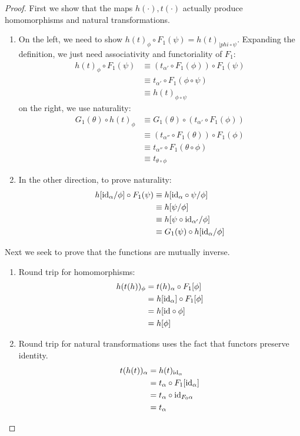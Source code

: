 \documentclass{article}
\begin{document}
\begin{proof}
  First we show that the maps $h(\cdot),t(\cdot)$ actually produce
  homomorphisms and natural transformations.
  \begin{enumerate}
  \item On the left, we need to show $h(t)_{\phi} \circ F_1(\psi) =
    h(t)_{|phi \circ \psi}$. Expanding the definition, we just need
    associativity and functoriality of $F_1$:
    \begin{align*}
      h(t)_{\phi} \circ F_1(\psi) &\equiv (t_{\alpha'} \circ F_1(\phi)) \circ F_1(\psi)\\
      &\equiv t_{\alpha'} \circ F_1(\phi \circ \psi)\\
      &\equiv h(t)_{\phi \circ \psi}
    \end{align*}
    on the right, we use naturality:
    \begin{align*}
      G_1(\theta) \circ h(t)_{\phi} &\equiv G_1(\theta) \circ (t_{\alpha'} \circ F_1(\phi))\\
      &\equiv (t_{\alpha''} \circ F_1(\theta)) \circ F_1(\phi)\\
      &\equiv t_{\alpha''} \circ F_1(\theta \circ \phi)\\
      &\equiv t_{\theta \circ \phi}
    \end{align*}
  \item In the other direction, to prove naturality:
    \begin{align*}
      h[\text{id}_\alpha/\phi] \circ F_1(\psi) &\equiv h[\text{id}_\alpha \circ \psi/\phi]\\
      &\equiv h[\psi/\phi]\\
      &\equiv h[\psi \circ \text{id}_{\alpha'}/\phi]\\
      &\equiv G_1(\psi) \circ h[\text{id}_{\alpha}/\phi]
    \end{align*}
  \end{enumerate}
  Next we seek to prove that the functions are mutually inverse.
  \begin{enumerate}
  \item Round trip for homomorphisms:
    \begin{align*}
      h(t(h))_{\phi} &= t(h)_{\alpha} \circ F_1[\phi]\\
      &= h[\text{id}_{\alpha}] \circ F_1[\phi]\\
      &= h[\text{id} \circ \phi]\\
      &= h[\phi]
    \end{align*}
  \item Round trip for natural transformations uses the fact that
    functors preserve identity.
    \begin{align*}
      t(h(t))_{\alpha} &= h(t)_{\text{id}_{\alpha}}\\
      &= t_{\alpha} \circ F_1[\text{id}_{\alpha}]\\
      &= t_{\alpha} \circ \text{id}_{F_0\alpha}\\
      &= t_{\alpha}
    \end{align*}
  \end{enumerate}
\end{proof}
\end{document}
